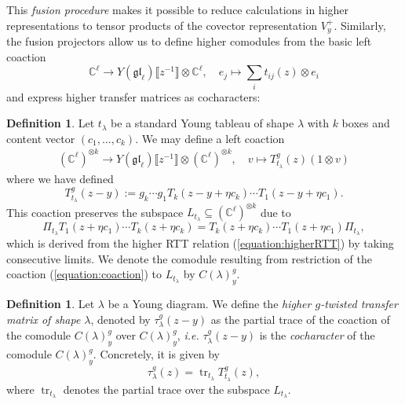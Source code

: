 \documentclass[11pt]{report}
\theoremstyle{definition}
\newtheorem{definition}[theorem]{Definition}
\theoremstyle{remark}
\theoremstyle{remark}
\newcommand{\C}{\mathbb{C}}
\begin{document}
This \emph{fusion procedure} makes it possible to reduce calculations in higher representations to tensor products of the covector representation $V_y^+$. Similarly, the fusion projectors allow us to define higher comodules from the basic left coaction
\begin{equation*}
\C^\ell \to Y(\mathfrak{gl}_\ell)\llbracket z^{-1} \rrbracket \otimes \C^\ell, \quad e_j \mapsto \sum_i t_{ij}(z) \otimes e_i
\end{equation*}
and express higher transfer matrices as cocharacters:

\begin{definition}
Let $t_\lambda$ be a standard Young tableau of shape $\lambda$ with $k$ boxes and content vector $(c_1,...,c_k)$. We may define a left coaction
\begin{align}\label{equation:coaction}
(\C^\ell)^{\otimes k} \to Y(\mathfrak{gl}_\ell)\llbracket z^{-1} \rrbracket \otimes (\C^\ell)^{\otimes k}, \quad v \mapsto T_{t_\lambda}^g(z)(1 \otimes v)
\end{align}
where we have defined
\begin{equation*}
T_{t_\lambda}^g(z-y) := g_k \cdots g_1 T_k(z-y+\eta c_k) \cdots T_1(z-y+\eta c_1).
\end{equation*}
This coaction preserves the subspace $L_{t_\lambda} \subseteq (\C^\ell)^{\otimes k}$ due to
\begin{equation*}
\Pi_{t_\lambda} T_1(z+\eta c_1) \cdots T_k(z+\eta c_k) = T_k(z+\eta c_k) \cdots T_1(z+\eta c_1) \Pi_{t_\lambda},
\end{equation*}
which is derived from the higher RTT relation (\ref{equation:higherRTT}) by taking consecutive limits. We denote the comodule resulting from restriction of the coaction (\ref{equation:coaction}) to $L_{t_\lambda}$ by $C(\lambda)_y^g$.
\end{definition}

\begin{definition}
Let $\lambda$ be a Young diagram. We define the \emph{higher $g$-twisted transfer matrix of shape $\lambda$}, denoted by $\tau_\lambda^g(z-y)$ as the partial trace of the coaction of the comodule $C(\lambda)_y^g$ over $C(\lambda)_y^g$, \emph{i.e.} $\tau_\lambda^g(z-y)$ is the \emph{cocharacter} of the comodule $C(\lambda)_y^g$. Concretely, it is given by
\begin{equation*}
\tau_\lambda^g(z) = \operatorname{tr}_{t_\lambda} T_{t_\lambda}^g(z),
\end{equation*}
where $\operatorname{tr}_{t_\lambda}$ denotes the partial trace over the subspace $L_{t_\lambda}$.
\end{definition}
\end{document}
